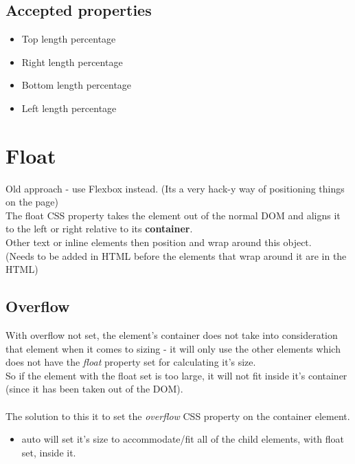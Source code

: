 \documentclass[]{article}
\newcommand{\<}{\guilsinglleft}
\renewcommand{\>}{\guilsinglright}
\renewcommand{\it}[1]{\textit{#1}}
\renewcommand{\bf}[1]{\textbf{#1}}
\begin{document}
\subsection{Accepted properties}
\begin{itemize}
	\item Top
	\subitem \<length\>
	\subitem percentage	
	
	\item Right
	\subitem \<length\>
	\subitem percentage
	
	\item Bottom
	\subitem \<length\>
	\subitem percentage
	
	\item Left	
	\subitem \<length\>
	\subitem percentage
\end{itemize}

\section{Float}
Old approach - use Flexbox instead. (Its a very hack-y way of positioning things on the page)
\\
The float CSS property takes the element out of the normal DOM and aligns it to the left or right relative to its \bf{container}.
\\
Other text or inline elements then position and wrap around this object.
\\
(Needs to be added in HTML before the elements that wrap around it are in the HTML)

\subsection{Overflow}
With overflow not set, the element's container does not take into consideration that element when it comes to sizing - it will only use the other elements which does not have the \it{float} property set for calculating it's size.
\\
So if the element with the float set is too large, it will not fit inside it's container (since it has been taken out of the DOM).
\\\\
The solution to this it to set the \it{overflow} CSS property on the container element. 
\begin{itemize}
	\item auto
	\subitem will set it's size to accommodate/fit all of the child elements, with float set, inside it.
\end{itemize}
\end{document}

